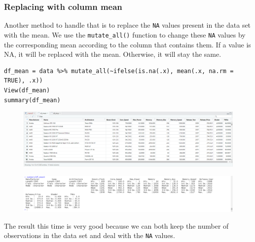 \documentclass[a4paper]{article}
\begin{document}
\subsubsection{Replacing with column mean}
Another method to handle that is to replace the \verb|NA| values present in the data set with the mean. We use the \verb|mutate_all()| function to change these \verb|NA| values by the corresponding mean according to the column that contains them. If a value is NA, it will be replaced with the mean. Otherwise, it will stay the same.
\begin{mdframed}[leftline=false,rightline=false,backgroundcolor=lightblue!10,nobreak=false]
    \begin{verbatim}
df_mean = data %>% mutate_all(~ifelse(is.na(.x), mean(.x, na.rm = TRUE), .x))       
View(df_mean)
summary(df_mean)
    \end{verbatim}
\end{mdframed}
\begin{figure}[H]
    \centering
    \includegraphics[keepaspectratio, width=1\textwidth, height=1\textheight]{Clean/df_mean.png}
\end{figure}
\begin{figure}[H]
    \centering
    \includegraphics[keepaspectratio, width=1\textwidth, height=1\textheight]{Clean/df_mean_summary.png}
\end{figure}
The result this time is very good because we can both keep the number of observations in the data set and deal with the \verb|NA| values.
\end{document}

